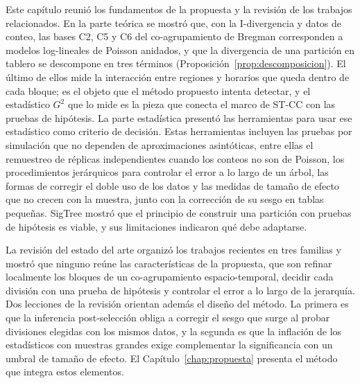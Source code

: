 Este capítulo reunió los fundamentos de la propuesta y la revisión de los
trabajos relacionados. En la parte teórica se mostró que, con la I-divergencia y
datos de conteo, las bases C2, C5 y C6 del co-agrupamiento de Bregman
corresponden a modelos log-lineales de Poisson anidados, y que la divergencia de
una partición en tablero se descompone en tres términos
(Proposición~\ref{prop:descomposicion}). El último de ellos mide la interacción
entre regiones y horarios que queda dentro de cada bloque; es el objeto que el
método propuesto intenta detectar, y el estadístico $G^2$ que lo mide es la pieza
que conecta el marco de \ac{ST-CC} con las pruebas de hipótesis. La parte
estadística presentó las herramientas para usar ese estadístico como criterio de
decisión. Estas herramientas incluyen las pruebas por simulación que no dependen
de aproximaciones asintóticas, entre ellas el remuestreo de réplicas
independientes cuando los conteos no son de Poisson, los procedimientos
jerárquicos para controlar el error a lo largo de un árbol, las formas de
corregir el doble uso de los datos y las medidas de tamaño de efecto que no
crecen con la muestra, junto con la corrección de su sesgo en tablas pequeñas.
SigTree mostró que el principio de construir una
partición con pruebas de hipótesis es viable, y sus limitaciones indicaron qué
debe adaptarse.

La revisión del estado del arte organizó los trabajos recientes en tres familias
y mostró que ninguno reúne las características de la propuesta, que son refinar
localmente los bloques de un co-agrupamiento espacio-temporal, decidir cada
división con una prueba de hipótesis y controlar el error a lo largo de la
jerarquía. Dos lecciones de la revisión orientan además el diseño del método. La primera es
que la inferencia post-selección obliga a corregir el sesgo que surge al probar
divisiones elegidas con los mismos datos, y la segunda es que la inflación de los
estadísticos con muestras grandes exige complementar la significancia con un umbral de tamaño de
efecto. El Capítulo~\ref{chap:propuesta} presenta el método que integra estos
elementos.